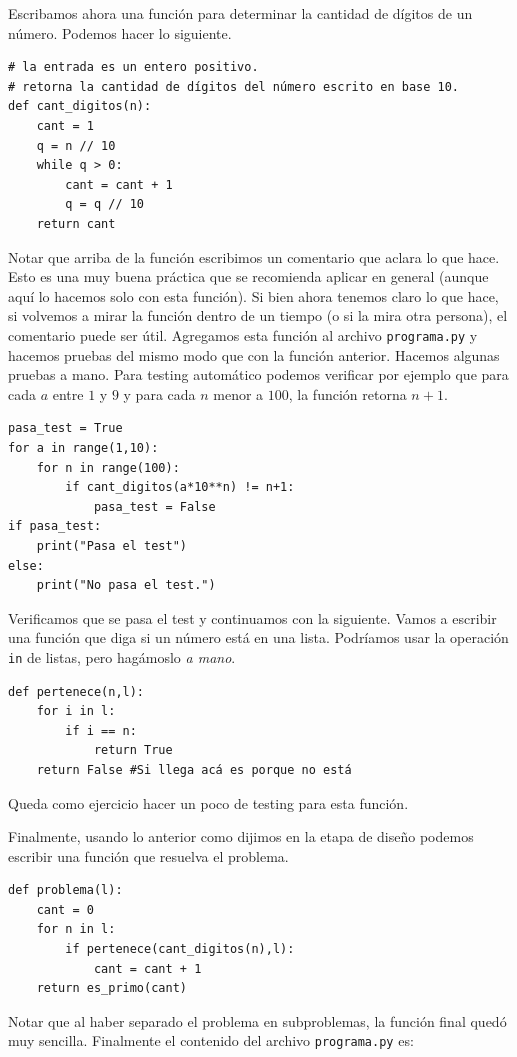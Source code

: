 \documentclass[a4paper, 12pt]{report}
\theoremstyle{definition}
\begin{document}
Escribamos ahora una función para determinar la cantidad de dígitos de un número. Podemos hacer lo siguiente.
\begin{verbatim}
# la entrada es un entero positivo.
# retorna la cantidad de dígitos del número escrito en base 10.
def cant_digitos(n):
    cant = 1
    q = n // 10
    while q > 0:
        cant = cant + 1
        q = q // 10
    return cant
\end{verbatim}
Notar que arriba de la función escribimos un comentario que aclara lo que hace. Esto es una muy buena práctica que se recomienda aplicar en general (aunque aquí lo hacemos solo con esta función). Si bien ahora tenemos claro lo que hace, si volvemos a mirar la función dentro de un tiempo (o si la mira otra persona), el comentario puede ser útil. Agregamos esta función al archivo {\tt programa.py} y hacemos pruebas del mismo modo que con la función anterior. Hacemos algunas pruebas a mano. Para testing automático podemos verificar por ejemplo que para cada $a$ entre $1$ y $9$ y para cada $n$ menor a $100$, la función retorna $n+1$.
\begin{verbatim}
pasa_test = True
for a in range(1,10):
    for n in range(100):
        if cant_digitos(a*10**n) != n+1:
            pasa_test = False
if pasa_test:
    print("Pasa el test")
else:
    print("No pasa el test.")
\end{verbatim}
Verificamos que se pasa el test y continuamos con la siguiente. Vamos a escribir una función que diga si un número está en una lista. Podríamos usar la operación {\tt in} de listas, pero hagámoslo {\sl a mano}.
\begin{verbatim}
def pertenece(n,l):
    for i in l:
        if i == n:
            return True
    return False #Si llega acá es porque no está
\end{verbatim}
Queda como ejercicio hacer un poco de testing para esta función.

Finalmente, usando lo anterior como dijimos en la etapa de diseño podemos escribir una función que resuelva el problema.
\begin{verbatim}
def problema(l):
    cant = 0
    for n in l:
        if pertenece(cant_digitos(n),l):
            cant = cant + 1
    return es_primo(cant)
\end{verbatim}
Notar que al haber separado el problema en subproblemas, la función final quedó muy sencilla. Finalmente el contenido del archivo {\tt programa.py} es:
\end{document}
